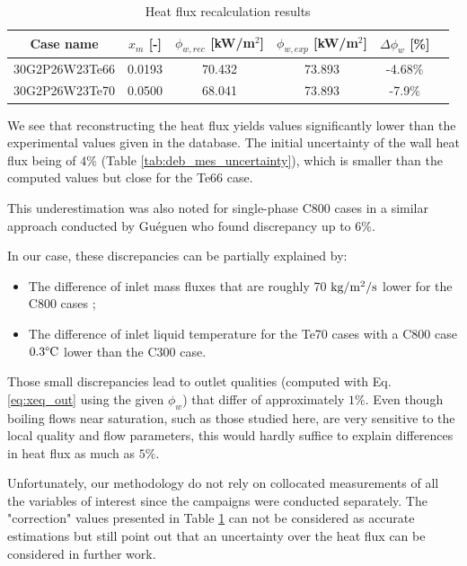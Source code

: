 \begin{table}[!h]
\centering

\begin{tabular}{c||c|c|c|c|c}
Case name & $x_{m}$ [-] & $\phi_{w,rec}$ [kW/m$^{2}$] & $\phi_{w,exp}$ [kW/m$^{2}$] & $\Delta \phi_{w}$ [\%]  \\
\hline
\hline
30G2P26W23Te66 & 0.0193 & 70.432 & 73.893 & -4.68\%\\
\hline
30G2P26W23Te70 & 0.0500 & 68.041 & 73.893 & -7.9\%\\
\end{tabular}

\caption{Heat flux recalculation results}
\label{tab:debora_flux_corr_res}

\end{table}

We see that reconstructing the heat flux yields values significantly lower than the experimental values given in the database. The initial uncertainty of the wall heat flux being of $4\%$ (Table \ref{tab:deb_mes_uncertainty}), which is smaller than the computed values but close for the Te66 case.

\npar

This underestimation was also noted for single-phase C800 cases in a similar approach conducted by Guéguen \cite{gueguen_contribution_2013} who found discrepancy up to 6\%.

In our case, these discrepancies can be partially explained by:
\begin{itemize}
\item The difference of inlet mass fluxes that are roughly 70 $\text{kg/m$^{2}$/s}$ lower for the C800 cases ;
\item The difference of inlet liquid temperature for the Te70 cases with a C800 case $0.3\degree\mathrm{C}$ lower than the C300 case.
\end{itemize} 

Those small discrepancies lead to outlet qualities (computed with Eq. \ref{eq:xeq_out} using the given $\phi_{w}$) that differ of approximately $1\%$. Even though boiling flows near saturation, such as those studied here, are very sensitive to the local quality and flow parameters, this would hardly suffice to explain differences in heat flux as much as $5\%$.

\npar
\begin{remark*}{}
Unfortunately, our methodology do not rely on collocated measurements of all the variables of interest since the campaigns were conducted separately. The "correction" values presented in Table \ref{tab:debora_flux_corr_res} can not be considered as accurate estimations but still point out that an uncertainty over the heat flux can be considered in further work.
\end{remark*}



